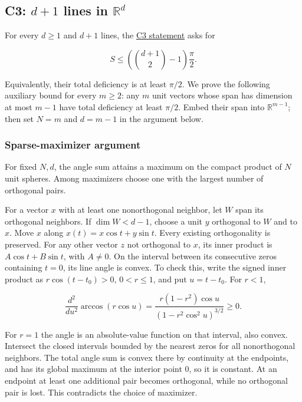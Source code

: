 \documentclass[11pt,a4paper]{article}
\begin{document}
\subsection{\texorpdfstring{C3: \(d+1\) lines in \(\mathbb R^d\)}{C3: d+1 lines in \textbackslash mathbb R\^{}d}}\label{c3-d1-lines-in-mathbb-rd}

For every \(d\ge1\) and \(d+1\) lines, the \href{https://hackathon.bainsa.ai/p/p1/c3}{C3 statement} asks for

\[
S\le\left(\binom{d+1}{2}-1\right)\frac{\pi}{2}.
\]

Equivalently, their total deficiency is at least \(\pi/2\). We prove the following auxiliary bound for every \(m\ge2\): any \(m\) unit vectors whose span has dimension at most \(m-1\) have total deficiency at least \(\pi/2\). Embed their span into \(\mathbb R^{m-1}\); then set \(N=m\) and \(d=m-1\) in the argument below.

\subsubsection{Sparse-maximizer argument}\label{sparse-maximizer-argument}

For fixed \(N,d\), the angle sum attains a maximum on the compact product of \(N\) unit spheres. Among maximizers choose one with the largest number of orthogonal pairs.

For a vector \(x\) with at least one nonorthogonal neighbor, let \(W\) span its orthogonal neighbors. If \(\dim W<d-1\), choose a unit \(y\) orthogonal to \(W\) and to \(x\). Move \(x\) along \(x(t)=x\cos t+y\sin t\). Every existing orthogonality is preserved. For any other vector \(z\) not orthogonal to \(x\), its inner product is \(A\cos t+B\sin t\), with \(A\ne0\). On the interval between its consecutive zeros containing \(t=0\), its line angle is convex. To check this, write the signed inner product as \(r\cos(t-t_0)>0\), \(0<r\le1\), and put \(u=t-t_0\). For \(r<1\),

\[
\frac{d^2}{du^2}\arccos(r\cos u)=\frac{r(1-r^2)\cos u}{(1-r^2\cos^2 u)^{3/2}}\ge0.
\]

For \(r=1\) the angle is an absolute-value function on that interval, also convex. Intersect the closed intervals bounded by the nearest zeros for all nonorthogonal neighbors. The total angle sum is convex there by continuity at the endpoints, and has its global maximum at the interior point \(0\), so it is constant. At an endpoint at least one additional pair becomes orthogonal, while no orthogonal pair is lost. This contradicts the choice of maximizer.
\end{document}
